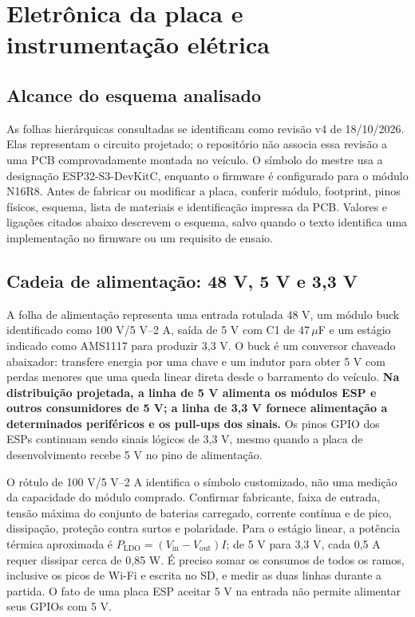 \chapter{Eletrônica da placa e instrumentação elétrica}\label{cap:eletronica}
\section{Alcance do esquema analisado}
As folhas hierárquicas consultadas se identificam como revisão v4 de 18/10/2026. Elas representam o circuito projetado; o repositório não associa essa revisão a uma PCB comprovadamente montada no veículo. O símbolo do mestre usa a designação ESP32-S3-DevKitC, enquanto o firmware é configurado para o módulo N16R8. Antes de fabricar ou modificar a placa, conferir módulo, footprint, pinos físicos, esquema, lista de materiais e identificação impressa da PCB. Valores e ligações citados abaixo descrevem o esquema, salvo quando o texto identifica uma implementação no firmware ou um requisito de ensaio.

\section{Cadeia de alimentação: 48 V, 5 V e 3,3 V}
A folha de alimentação representa uma entrada rotulada 48 V, um módulo buck identificado como 100 V/5 V--2 A, saída de 5 V com C1 de 47\,$\mu$F e um estágio indicado como AMS1117 para produzir 3,3 V. O buck é um conversor chaveado abaixador: transfere energia por uma chave e um indutor para obter 5 V com perdas menores que uma queda linear direta desde o barramento do veículo. \textbf{Na distribuição projetada, a linha de 5 V alimenta os módulos ESP e outros consumidores de 5 V; a linha de 3,3 V fornece alimentação a determinados periféricos e os pull-ups dos sinais.} Os pinos GPIO dos ESPs continuam sendo sinais lógicos de 3,3 V, mesmo quando a placa de desenvolvimento recebe 5 V no pino de alimentação.

O rótulo de 100 V/5 V--2 A identifica o símbolo customizado, não uma medição da capacidade do módulo comprado. Confirmar fabricante, faixa de entrada, tensão máxima do conjunto de baterias carregado, corrente contínua e de pico, dissipação, proteção contra surtos e polaridade. Para o estágio linear, a potência térmica aproximada é $P_{\mathrm{LDO}}=(V_{\mathrm{in}}-V_{\mathrm{out}})I$; de 5 V para 3,3 V, cada 0,5 A requer dissipar cerca de 0,85 W. É preciso somar os consumos de todos os ramos, inclusive os picos de Wi-Fi e escrita no SD, e medir as duas linhas durante a partida. O fato de uma placa ESP aceitar 5 V na entrada não permite alimentar seus GPIOs com 5 V.

